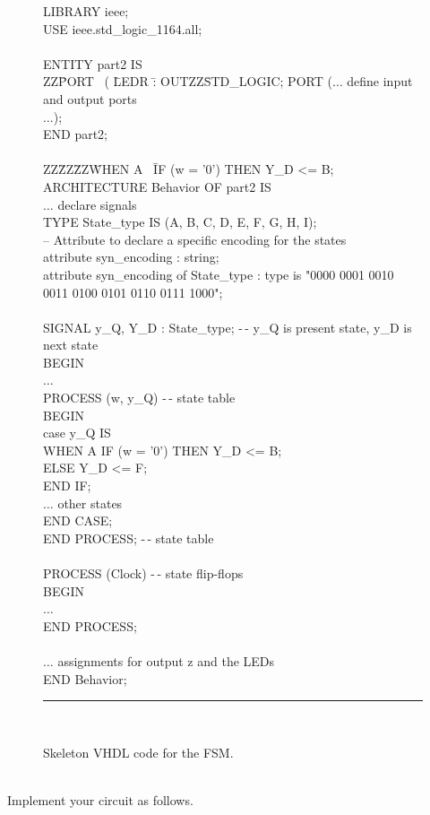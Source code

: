 \documentclass[epsfig,10pt,fullpage]{article}
\begin{document}
\begin{figure}[H]
\begin{center}
\begin{tabbing}
LIBRARY ieee;\\
USE ieee.std\_logic\_1164.all;\\
~\\
ENTITY part2 IS\\
ZZ\=PORT ~( \=LEDR \=: OUTZZ\=STD\_LOGIC;\kill
\>PORT (\>$\ldots$ define input and output ports\\
\>\>$\ldots$);\\
END part2;\\
~\\
ZZ\=ZZ\=ZZ\=WHEN A ~\=IF (w = '0') THEN Y\_D <= B;\kill
ARCHITECTURE Behavior OF part2 IS\\
\>$\ldots$ declare signals\\
\>TYPE State\_type IS (A, B, C, D, E, F, G, H, I);\\
\>-- Attribute to declare a specific encoding for the states\\
\>attribute syn\_encoding : string;\\
\>attribute syn\_encoding of State\_type : type is "0000 0001 0010 0011 0100 0101 0110 0111 1000";\\
~\\
\>SIGNAL y\_Q, Y\_D : State\_type; -$\,$- y\_Q is present state, y\_D is next state\\
BEGIN\\
\>$\ldots$ \\
\>PROCESS (w, y\_Q) -$\,$- state table\\
\>BEGIN\\
\>\>case y\_Q IS\\
\>\>\>WHEN A \>IF (w = '0') THEN Y\_D <= B;\\
\>\>\>\>ELSE Y\_D <= F;\\
\>\>\>\>END IF;\\
\>\>\>$\ldots$ other states\\
\>\>END CASE;\\
\>END PROCESS; -$\,$- state table\\
~\\
\>PROCESS (Clock) -$\,$- state flip-flops\\
\>BEGIN\\
\>\>$\ldots$ \\
\>END PROCESS;\\
~\\
\>$\ldots$ assignments for output z and the LEDs\\
END Behavior;
~\rule{5.0in}{0in}\\
\end{tabbing}
\end{center}
\caption{Skeleton VHDL code for the FSM.}
\label{fig:skeleton_code}
\end{figure}
~\\
Implement your circuit as follows.
\end{document}
